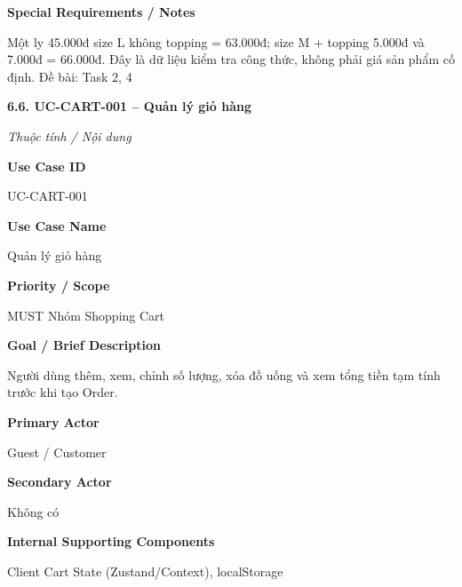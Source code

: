 \documentclass[11pt,a4paper,oneside]{report}
\begin{document}
\par\smallskip\noindent\textcolor{sgublue}{\textbf{Special Requirements / Notes}}\par\nobreak
Một ly 45.000đ size L không topping = 63.000đ; size M + topping 5.000đ và 7.000đ = 66.000đ. Đây là dữ liệu kiểm tra công thức, không phải giá sản phẩm cố định. \textbar{} Đề bài: Task 2, 4
\par



\textbf{6.6. UC-CART-001 -- Quản lý giỏ hàng}



\par\noindent\textit{Thuộc tính / Nội dung}\par

\par\smallskip\noindent\textcolor{sgublue}{\textbf{Use Case ID}}\par\nobreak
UC-CART-001
\par

\par\smallskip\noindent\textcolor{sgublue}{\textbf{Use Case Name}}\par\nobreak
Quản lý giỏ hàng
\par

\par\smallskip\noindent\textcolor{sgublue}{\textbf{Priority / Scope}}\par\nobreak
MUST \textbar{} Nhóm Shopping Cart
\par

\par\smallskip\noindent\textcolor{sgublue}{\textbf{Goal / Brief Description}}\par\nobreak
Người dùng thêm, xem, chỉnh số lượng, xóa đồ uống và xem tổng tiền tạm tính trước khi tạo Order.
\par

\par\smallskip\noindent\textcolor{sgublue}{\textbf{Primary Actor}}\par\nobreak
Guest / Customer
\par

\par\smallskip\noindent\textcolor{sgublue}{\textbf{Secondary Actor}}\par\nobreak
Không có
\par

\par\smallskip\noindent\textcolor{sgublue}{\textbf{Internal Supporting Components}}\par\nobreak
Client Cart State (Zustand/Context), localStorage
\par
\end{document}
